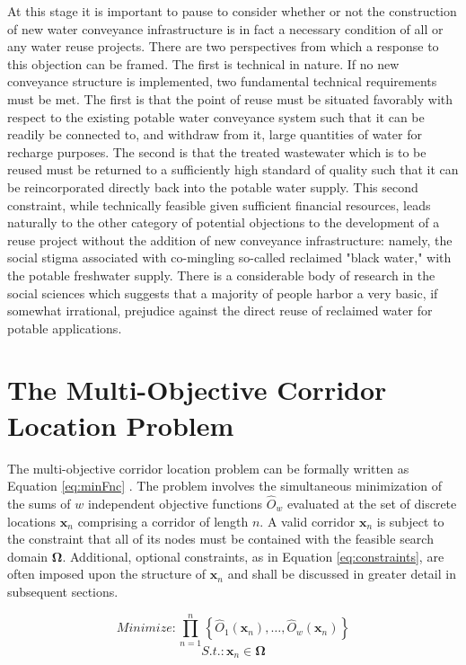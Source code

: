 At this stage it is important to pause to consider whether or not the construction of new water conveyance infrastructure is in fact a necessary condition of all or any water reuse projects. There are two perspectives from which a response to this objection can be framed. The first is technical in nature. If no new conveyance structure is implemented, two fundamental technical requirements must be met. The first is that the point of reuse must be situated favorably with respect to the existing potable water conveyance system such that it can be readily be connected to, and withdraw from it, large quantities of water for recharge purposes. The second is that the treated wastewater which is to be reused must be returned to a sufficiently high standard of quality such that it can be reincorporated directly back into the potable water supply. This second constraint, while technically feasible given sufficient financial resources, leads naturally to the other category of potential objections to the development of a reuse project without the addition of new conveyance infrastructure: namely, the social stigma associated with co-mingling so-called reclaimed "black water," with the potable freshwater supply. There is a considerable body of research in the social sciences which suggests that a majority of people harbor a very basic, if somewhat irrational, prejudice against the direct reuse of reclaimed water for potable applications. 
            
\section{The Multi-Objective Corridor Location Problem}
            
The multi-objective corridor location problem can be formally written as Equation \ref{eq:minFnc} \cite{Zhou2011}. The problem involves the simultaneous minimization of the sums of $w$ independent objective functions $\hat{O}_w$ evaluated at the set of discrete locations $\textbf{x}_n$ comprising a corridor of length $n$. A valid corridor $\textbf{x}_n$ is subject to the constraint that all of its nodes must be contained with the feasible search domain $\boldsymbol{\Omega}$. Additional, optional constraints, as in Equation \ref{eq:constraints}, are often imposed upon the structure of $\textbf{x}_n$ and shall be discussed in greater detail in subsequent sections.
            
            \begin{equation}
            Minimize: \prod\limits_{n=1}^n \left\{\hat{O}_1(\textbf{x}_n), \dots, \hat{O}_w(\textbf{x}_n)\right\}
            \label{eq:minFnc}
            \end{equation}
            \begin{equation}
            S.t.: \textbf{x}_n \in \boldsymbol\Omega
            \label{eq:constraints}
            \end{equation}
            
